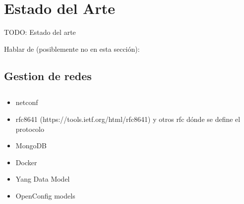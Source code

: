 \chapter{Estado del Arte\label{sec:estado_del_arte}}

TODO: Estado del arte

Hablar de (posiblemente no en esta sección):

\section{Gestion de redes\label{sec:estado_del_arte}}



\section{}

\begin{itemize}
  \item netconf
  \item rfc8641 (https://tools.ietf.org/html/rfc8641) y otros rfc dónde se define el protocolo
  \item MongoDB
  \item Docker
  \item Yang Data Model
  \item OpenConfig models
\end{itemize}  



